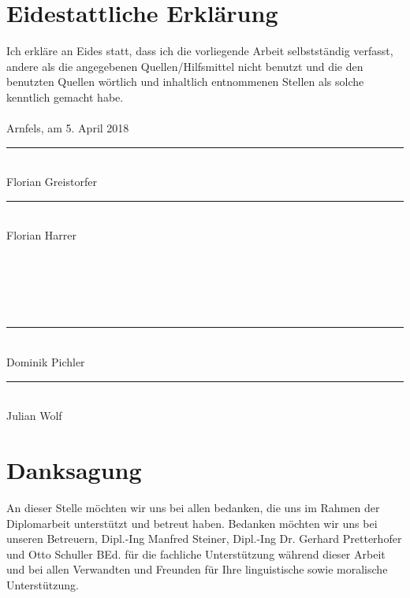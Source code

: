\frontmatter
{}
\addtocounter{page}{2}

\newcommand{\doublesignature}[1]{%
  \parbox{\textwidth}{
    \hfill
    \parbox{7cm}{
      \centering
      \rule{6cm}{1pt}\\
      Florian Greistorfer
    }
    \parbox{7cm}{
      \centering
      \rule{6cm}{1pt}\\
      Florian Harrer
    }
  }
}
\newcommand{\doublesign}[1]{%
\mbox{}\\
\mbox{}\\
\mbox{}\\
\mbox{}\\
  \parbox{\textwidth}{
    \hfill
    \parbox{7cm}{
      \centering
      \rule{6cm}{1pt}\\
      Dominik Pichler
    }
    \parbox{7cm}{
      \centering
      \rule{6cm}{1pt}\\
      Julian Wolf
    }
  }
}

\vspace*{20pt}

\section*{Eidestattliche Erklärung}
\label{sec:eidestattliche-erklaerung}
Ich erkläre an Eides statt, dass ich die vorliegende Arbeit selbstständig verfasst, andere als die angegebenen
Quellen/Hilfsmittel nicht benutzt und die den benutzten Quellen wörtlich und inhaltlich entnommenen
Stellen als solche kenntlich gemacht habe.\\
\\
Arnfels, am 5. April 2018\\

\vskip 1cm

\doublesignature{}
\doublesign{}

\vskip 5cm

\clearpage

\newpage
\thispagestyle{empty}
\mbox{}

\clearpage

\section*{Danksagung}
\label{sec:danksagung}
An dieser Stelle möchten wir uns bei allen bedanken, die uns im Rahmen der Diplomarbeit unterstützt und
betreut haben.
Bedanken möchten wir uns bei unseren Betreuern, Dipl.-Ing Manfred Steiner, Dipl.-Ing Dr. Gerhard Pretterhofer
und Otto Schuller BEd. für die fachliche Unterstützung während dieser Arbeit und bei allen Verwandten und Freunden für Ihre linguistische sowie moralische Unterstützung.


